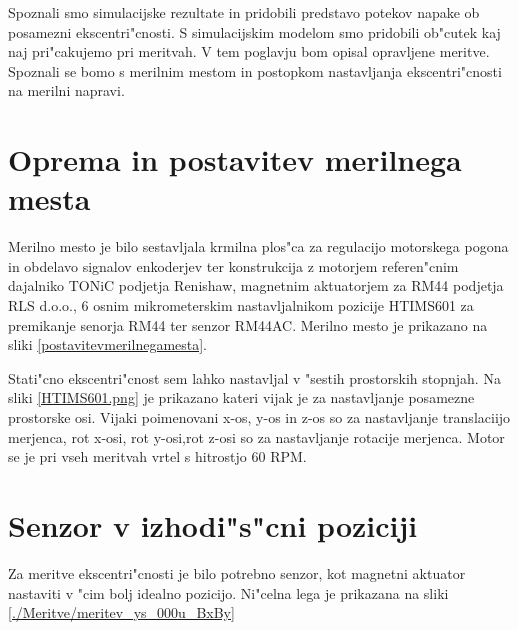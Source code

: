 %
%



Spoznali smo simulacijske rezultate in pridobili predstavo potekov napake ob posamezni ekscentri"cnosti. S simulacijskim modelom smo pridobili ob"cutek kaj naj pri"cakujemo pri meritvah. V tem poglavju bom opisal opravljene meritve. Spoznali se bomo s merilnim mestom in postopkom nastavljanja ekscentri"cnosti na merilni napravi.
\section{Oprema in postavitev merilnega mesta}

Merilno mesto je bilo sestavljala krmilna plos"ca za regulacijo motorskega pogona in obdelavo signalov enkoderjev ter konstrukcija z motorjem referen"cnim dajalniko TONiC podjetja Renishaw, magnetnim aktuatorjem za RM44 podjetja RLS  d.o.o., 6 osnim mikrometerskim nastavljalnikom pozicije HTIMS601 za premikanje senorja RM44 ter senzor RM44AC. Merilno mesto je prikazano na sliki \ref{postavitevmerilnegamesta}.

Stati"cno ekscentri"cnost sem lahko nastavljal v "sestih prostorskih stopnjah. Na sliki \ref{HTIMS601.png} je prikazano kateri vijak je za nastavljanje posamezne prostorske osi. Vijaki poimenovani x-os, y-os in z-os so za nastavljanje translaciijo merjenca, rot x-osi, rot y-osi,rot z-osi so za nastavljanje rotacije merjenca. Motor se je pri vseh meritvah vrtel s hitrostjo 60 RPM.




\section{Senzor v izhodi"s"cni poziciji}
Za meritve ekscentri"cnosti je bilo potrebno senzor, kot magnetni aktuator nastaviti v "cim bolj idealno pozicijo. Ni"celna lega je prikazana na sliki \ref{./Meritve/meritev_ys_000u_BxBy}

